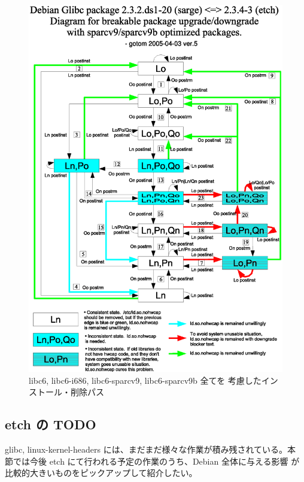 \documentclass[mingoth]{jsarticle}
\begin{document}
        \begin{figure}
        \begin{center}
        \includegraphics[scale=0.8,angle=0]{image200507/opt-crash.eps}
        \caption{libc6, libc6-i686, libc6-sparcv9, libc6-sparcv9b 全てを
	 考慮したインストール・削除パス}
        \label{opt-crash-sparc}
        \end{center}
	\end{figure}

\subsection{etch の TODO}

  glibc, linux-kernel-headers には、まだまだ様々な作業が積み残されている。本
  節では今後 etch にて行われる予定の作業のうち、Debian 全体に与える影響
  が比較的大きいものをピックアップして紹介したい。
\end{document}

